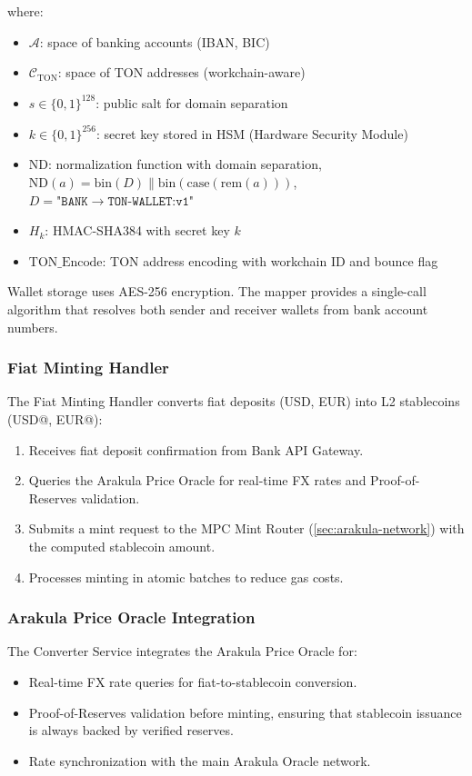 \documentclass[12pt,a4paper]{article}
\theoremstyle{definition}
\theoremstyle{remark}
\begin{document}
where:
\begin{itemize}[nosep]
    \item $\mathcal{A}$: space of banking accounts (IBAN, BIC)
    \item $\mathcal{C}_{\text{TON}}$: space of TON addresses (workchain-aware)
    \item $s \in \{0,1\}^{128}$: public salt for domain separation
    \item $k \in \{0,1\}^{256}$: secret key stored in HSM (Hardware Security Module)
    \item $\text{ND}$: normalization function with domain separation, $\text{ND}(a) = \text{bin}(D) \| \text{bin}(\text{case}(\text{rem}(a)))$, $D = \texttt{"BANK} \to \texttt{TON-WALLET:v1"}$
    \item $H_k$: HMAC-SHA384 with secret key $k$
    \item $\text{TON\_Encode}$: TON address encoding with workchain ID and bounce flag
\end{itemize}

Wallet storage uses AES-256 encryption. The mapper provides a single-call algorithm that resolves both sender and receiver wallets from bank account numbers.

\subsubsection{Fiat Minting Handler}

The Fiat Minting Handler converts fiat deposits (USD, EUR) into L2 stablecoins (USD@, EUR@):

\begin{enumerate}[nosep]
    \item Receives fiat deposit confirmation from Bank API Gateway.
    \item Queries the Arakula Price Oracle for real-time FX rates and Proof-of-Reserves validation.
    \item Submits a mint request to the MPC Mint Router (\cref{sec:arakula-network}) with the computed stablecoin amount.
    \item Processes minting in atomic batches to reduce gas costs.
\end{enumerate}

\subsubsection{Arakula Price Oracle Integration}

The Converter Service integrates the Arakula Price Oracle for:
\begin{itemize}[nosep]
    \item Real-time FX rate queries for fiat-to-stablecoin conversion.
    \item Proof-of-Reserves validation before minting, ensuring that stablecoin issuance is always backed by verified reserves.
    \item Rate synchronization with the main Arakula Oracle network.
\end{itemize}
\end{document}
